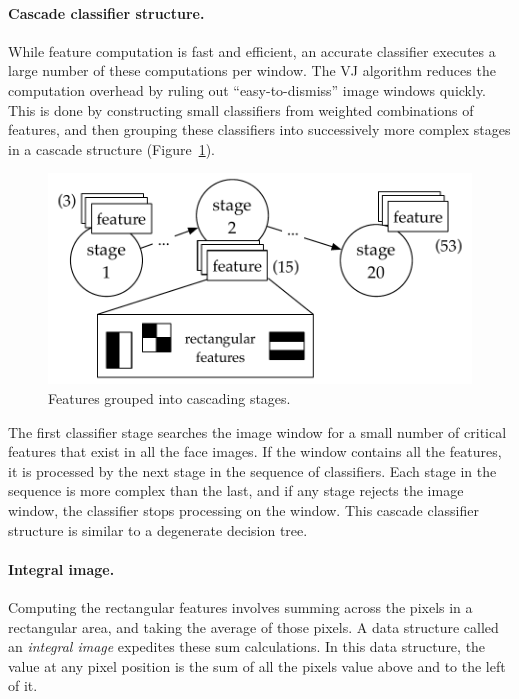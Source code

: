 \paragraph{Cascade classifier structure.} While feature computation is fast and efficient, an accurate classifier executes a large number of these computations per window. The VJ algorithm reduces the  computation overhead by ruling out ``easy-to-dismiss'' image windows quickly. This is done by constructing small classifiers from weighted combinations of features, and then grouping these classifiers into successively more complex stages in a cascade structure (Figure~\ref{fig:vj-cascade}).

\begin{figure}
  \centering
  \includegraphics[width=.6\textwidth]{nsp-figs/cascade_structure.pdf}
  \caption{Features grouped into cascading stages.}
  \label{fig:vj-cascade}
\end{figure}


The first classifier stage searches the image window for a small number of critical features that exist in all the face images. If the window contains all the features, it is processed by the next stage in the sequence of classifiers. Each stage in the sequence is more complex than the last, and if any stage rejects the image window, the classifier stops processing on the window. This cascade classifier structure is similar to a degenerate decision tree.

\paragraph{Integral image.}Computing the rectangular features involves summing across
the pixels in a rectangular area, and taking the average of those pixels.
A data structure called an \emph{integral image} expedites these sum calculations. In this
data structure, the value at any pixel position is the sum of all the pixels value above and
to the left of it.

